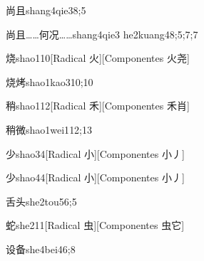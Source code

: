 \begin{verbete}{尚且}{shang4qie3}{8;5}
\end{verbete}

\begin{verbete}{尚且……何况……}{shang4qie3 he2kuang4}{8;5;7;7}
\end{verbete}

\begin{verbete}{烧}{shao1}{10}[Radical 火][Componentes 火尧]
\end{verbete}

\begin{verbete}{烧烤}{shao1kao3}{10;10}
\end{verbete}

\begin{verbete}{稍}{shao1}{12}[Radical 禾][Componentes 禾肖]
\end{verbete}

\begin{verbete}{稍微}{shao1wei1}{12;13}
\end{verbete}

\begin{verbete}{少}{shao3}{4}[Radical 小][Componentes 小丿]
\end{verbete}

\begin{verbete}{少}{shao4}{4}[Radical 小][Componentes 小丿]
\end{verbete}

\begin{verbete}{舌头}{she2tou5}{6;5}
\end{verbete}

\begin{verbete}{蛇}{she2}{11}[Radical 虫][Componentes 虫它]
\end{verbete}

\begin{verbete}{设备}{she4bei4}{6;8}
\end{verbete}

